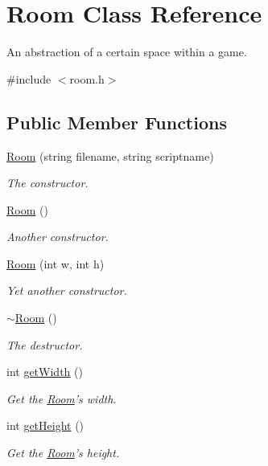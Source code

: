 \hypertarget{class_room}{\section{Room Class Reference}
\label{class_room}
}


An abstraction of a certain space within a game.  




{\ttfamily \#include $<$room.\-h$>$}

\subsection*{Public Member Functions}
\begin{DoxyCompactItemize}
\item 
\hyperlink{class_room_a5fd7380ec44c3e7c4c85cde194c8c4c5}{Room} (string filename, string scriptname)
\begin{DoxyCompactList}\small\item\em The constructor. \end{DoxyCompactList}\item 
\hyperlink{class_room_ac6ef93a7d9c3e1d624e025058d5f16ff}{Room} ()
\begin{DoxyCompactList}\small\item\em Another constructor. \end{DoxyCompactList}\item 
\hyperlink{class_room_aec8c6468cfa356445e072430df3ed73b}{Room} (int w, int h)
\begin{DoxyCompactList}\small\item\em Yet another constructor. \end{DoxyCompactList}\item 
\hyperlink{class_room_a67d5da09983cc53097807fd43ba5481a}{$\sim$\-Room} ()
\begin{DoxyCompactList}\small\item\em The destructor. \end{DoxyCompactList}\item 
int \hyperlink{class_room_a297c938f6a2e911b6ae846e795d6d05e}{get\-Width} ()
\begin{DoxyCompactList}\small\item\em Get the \hyperlink{class_room}{Room}'s width. \end{DoxyCompactList}\item 
int \hyperlink{class_room_acbc864ff80ab5e2782a9bbcf78377e06}{get\-Height} ()
\begin{DoxyCompactList}\small\item\em Get the \hyperlink{class_room}{Room}'s height. \end{DoxyCompactList}\item 

\end{DoxyCompactItemize}
